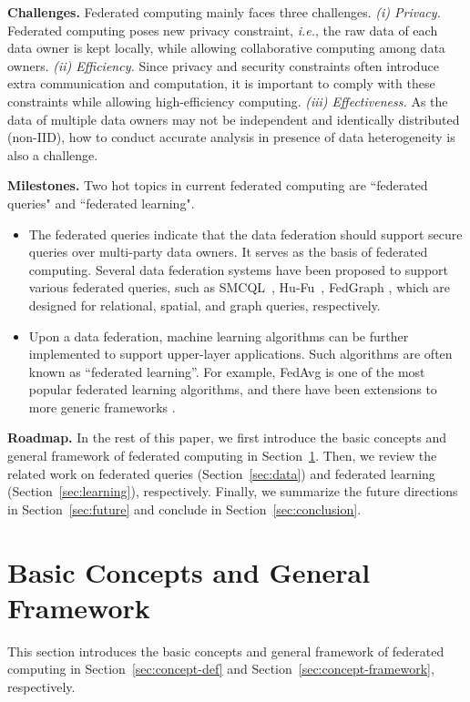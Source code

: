 \documentclass[11pt]{article}
\newcommand{\ie}{\textit{i.e.},\xspace}
\newcommand\secref[1]{Section~\ref{#1}}
\newcommand{\fakeparagraph}[1]{\vspace{1mm}\noindent\textbf{#1.}}
\begin{document}
\fakeparagraph{Challenges} 
Federated computing mainly faces three challenges.
\textit{(i) Privacy.}
Federated computing poses new privacy constraint, \ie the raw data of each data owner is kept locally, while allowing collaborative computing among data owners.
\textit{(ii) Efficiency.}
Since privacy and security constraints often introduce extra communication and computation, it is important to comply with these constraints while allowing high-efficiency computing.
\textit{(iii) Effectiveness.}
As the data of multiple data owners may not be independent and identically distributed (non-IID), how to conduct accurate analysis in presence of data heterogeneity is also a challenge.

\fakeparagraph{Milestones} 
Two hot topics in current federated computing are ``federated queries" and ``federated learning".
\begin{itemize}
    \item 
    The federated queries indicate that the data federation should support secure queries over multi-party data owners.
    It serves as the basis of federated computing. 
    Several data federation systems have been proposed to support various federated queries, such as \textsf{SMCQL}~\cite{ref_bater2017smcql}, \textsf{Hu-Fu}~\cite{ref_tong2022hu}, \textsf{FedGraph} \cite{DBLP:journals/pvldb/YuanMWZW21}, which are designed for relational, spatial, and graph queries, respectively.
    \item 
    Upon a data federation, machine learning algorithms can be further implemented to support upper-layer applications. 
    Such algorithms are often known as ``federated learning''. 
    For example, \textsf{FedAvg} \cite{DBLP:conf/aistats/McMahanMRHA17} is one of the most popular federated learning algorithms, and there have been extensions to more generic frameworks \cite{DBLP:journals/tist/YangLCT19}.
\end{itemize}

\fakeparagraph{Roadmap} 
In the rest of this paper, we first introduce the basic concepts and general framework of federated computing in \secref{sec:concept}. 
Then, we review the related work on federated queries (\secref{sec:data}) and federated learning (\secref{sec:learning}), respectively. 
Finally, we summarize the future directions in \secref{sec:future} and conclude in \secref{sec:conclusion}.

\section{Basic Concepts and General Framework}\label{sec:concept}
This section introduces the basic concepts and general framework of federated computing in \secref{sec:concept-def} and \secref{sec:concept-framework}, respectively.
\end{document}
